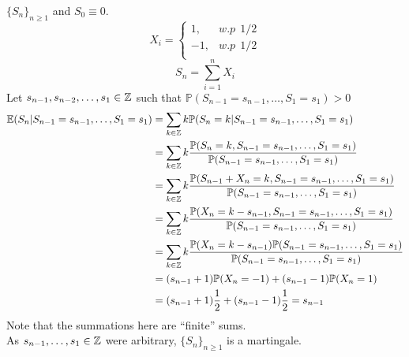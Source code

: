 \documentclass[main]{subfiles}
\begin{document}
\ex $\{S_n\}_{n \geq 1}$ and $S_0 \equiv 0$.
\begin{equation*}
  X_i=
  \begin{cases}
    1 ,  & w.p ~~ 1/2 \\
    -1 , & w.p ~~1/2  \\
  \end{cases}
\end{equation*}
$$S_n=\sum_{i=1}^n X_i$$
Let $s_{n-1},s_{n-2}, \ldots, s_1 \in \mathbb Z$ such that $\mathbb{P} (S_{n-1}=s_{n-1}, \ldots, S_1=s_1)>0$
\begin{align*}
  \mathbb{E} (S_n |S_{n-1}=s_{n-1}, \ldots, S_1=s_1) & = \sum_{k \in \mathbb Z} k \mathbb{P} (S_n =k |S_{n-1}=s_{n-1}, \ldots, S_1=s_1)                                                                        \\
                                                     & = \sum_{k \in \mathbb Z} k \frac{\mathbb{P}(S_n =k ,S_{n-1}=s_{n-1}, \ldots, S_1=s_1)}{\mathbb{P}(S_{n-1}=s_{n-1}, \ldots, S_1=s_1)}                    \\
                                                     & = \sum_{k \in \mathbb Z} k \frac{\mathbb{P}(S_{n-1} +X_n =k ,S_{n-1}=s_{n-1}, \ldots, S_1=s_1)}{\mathbb{P}(S_{n-1}=s_{n-1}, \ldots, S_1=s_1)}           \\
                                                     & = \sum_{k \in \mathbb Z} k \frac{\mathbb{P}(X_n =k -s_{n-1} ,S_{n-1}=s_{n-1}, \ldots, S_1=s_1)}{\mathbb{P}(S_{n-1}=s_{n-1}, \ldots, S_1=s_1)}           \\
                                                     & = \sum_{k \in \mathbb Z} k \frac{\mathbb{P}(X_n =k-s_{n-1}) \mathbb{P}(S_{n-1}=s_{n-1}, \ldots, S_1=s_1)}{\mathbb{P}(S_{n-1}=s_{n-1}, \ldots, S_1=s_1)} \\
                                                     & = (s_{n-1}+1) \mathbb{P} (X_n=-1)+ (s_{n-1}-1) \mathbb{P} (X_n=1)                                                                                \\
                                                     & = (s_{n-1}+1) \frac{1}{2}+ (s_{n-1}-1) \frac{1}{2} =s_{n-1}                                                                                      \\
\end{align*}
Note that the summations here are ``finite'' sums.\\
As $s_{n-1},\ldots, s_1 \in \mathbb Z$ were arbitrary, $\{S_n\}_{n \geq 1}$ is a martingale.\\
\end{document}
